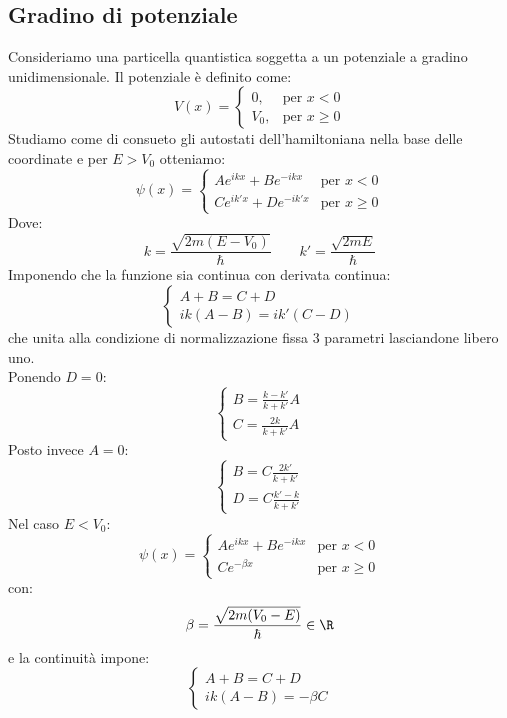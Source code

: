 \documentclass{article}
\begin{document}
\subsection{Gradino di potenziale}
Consideriamo una particella quantistica soggetta a un potenziale a gradino unidimensionale. Il potenziale è definito come:
$$
V(x) = 
\begin{cases}
0, & \text{per } x < 0 \\
V_0, & \text{per } x \geq 0
\end{cases}
$$
Studiamo come di consueto gli autostati dell'hamiltoniana nella base delle coordinate e per $E>V_0$ otteniamo:
$$
\psi(x) = 
\begin{cases}
Ae^{ikx} + Be^{-ikx} & \text{per } x < 0 \\
Ce^{ik'x} + De^{-ik'x} & \text{per } x \geq 0
\end{cases}
$$
Dove:
$$
k = \frac{{\sqrt{{2m(E - V_0)}}}}{{\hbar}} \qquad k' = \frac{{\sqrt{{2mE}}}}{{\hbar}}
$$
Imponendo che la funzione sia continua con derivata continua:
$$\begin{cases}
    A + B = C + D\\
ik(A - B) = ik'(C - D)
\end{cases}$$
che unita alla condizione di normalizzazione fissa 3 parametri lasciandone libero uno.\\
Ponendo $D=0$:
$$\begin{cases}
    B=\frac{k-k'}{k+k'}A\\
    C=\frac{2k}{k+k'}A
\end{cases}$$
Posto invece $A=0$:
$$\begin{cases}
    B=C\frac{2k'}{k+k'}\\
    D=C\frac{k'-k}{k+k'}
\end{cases}$$
Nel caso $E<V_0$:
$$
\psi(x) = 
\begin{cases}
Ae^{ikx} + Be^{-ikx} & \text{per } x < 0 \\
Ce^{-\beta x} & \text{per } x \geq 0
\end{cases}
$$
con:
$$\beta=\frac{\sqrt{2m(V_0-E)}}{\hbar}\in\R$$
e la continuità impone:
$$\begin{cases}
    A + B = C + D\\
ik(A - B) = -\beta C
\end{cases}$$
\end{document}
